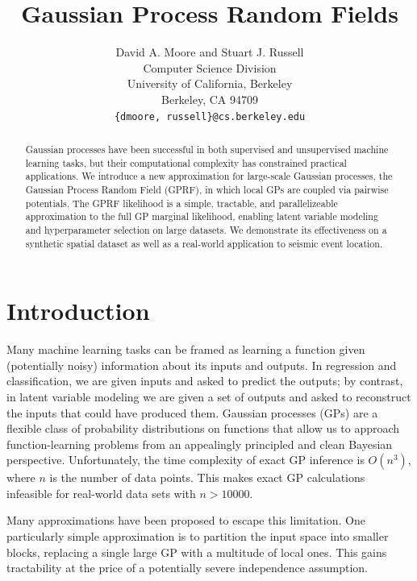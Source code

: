 \documentclass{article}
\begin{document}
\title{Gaussian Process Random Fields}

\author{
David A. Moore and Stuart J. Russell\\
Computer Science Division\\
University of California, Berkeley\\
Berkeley, CA 94709\\
\texttt{\{dmoore, russell\}@cs.berkeley.edu} 
}

\maketitle


\begin{abstract}
  Gaussian processes have been successful in both supervised and
  unsupervised machine learning tasks, but their computational
  complexity has constrained practical applications. We introduce a
  new approximation for large-scale Gaussian processes, the Gaussian
  Process Random Field (GPRF), in which local GPs are coupled via
  pairwise potentials. The GPRF likelihood is a simple, tractable, and
  parallelizeable approximation to the full GP marginal likelihood,
  enabling latent variable modeling and hyperparameter selection on
  large datasets.  We demonstrate its effectiveness on a synthetic
  spatial dataset as well as a real-world application to seismic event
  location.
\end{abstract}

\section{Introduction}

Many machine learning tasks can be framed as learning a function given
(potentially noisy) information about its inputs and outputs. In
regression and classification, we are given inputs and asked to
predict the outputs; by contrast, in latent variable modeling we are
given a set of outputs and asked to reconstruct the inputs that could
have produced them. Gaussian processes (GPs) are a flexible class of
probability distributions on functions that allow us to approach
function-learning problems from an appealingly principled and clean
Bayesian perspective. Unfortunately, the time complexity of exact GP
inference is $O(n^3)$, where $n$ is the number of data points. This makes exact GP calculations infeasible for
real-world data sets with $n > 10000$. 

Many approximations have been
proposed to escape this limitation. One particularly simple
approximation is to partition the input space into smaller blocks,
replacing a single large GP with a multitude of local ones. This gains
tractability at the price of a potentially severe independence assumption. 
\end{document}
